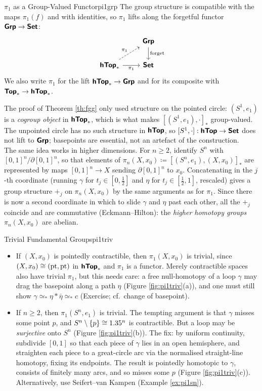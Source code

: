 \begin{remark}{$\pi_1$ as a Group-Valued Functor}{pi1grp}
  The group structure is compatible with the maps $\pi_1(f)$ and with identities, so $\pi_1$ lifts along the forgetful functor $\bm{\mathsf{Grp}}\to\bm{\mathsf{Set}}$: \[
  \begin{tikzcd}
    & \Grp \ar[d, "\text{forget}"] \\
    \hToppt \ar[ur, dashed, "\pi_1"] \ar[r, "\pi_1"'] & \Set
  \end{tikzcd}
  \]
  We also write $\pi_1$ for the lift $\bm{\mathsf{hTop}}_*\to\bm{\mathsf{Grp}}$ and for its composite with $\bm{\mathsf{Top}}_*\to\bm{\mathsf{hTop}}_*$.
\end{remark}

The proof of Theorem \ref{th:fgg} only used structure on the pointed circle: $(S^1,e_1)$ is a \emph{cogroup object} in $\bm{\mathsf{hTop}}_*$, which is what makes $[(S^1,e_1),\cdot]_*$ group-valued. The unpointed circle has no such structure in $\bm{\mathsf{hTop}}$, so $[S^1,\cdot]:\bm{\mathsf{hTop}}\to\bm{\mathsf{Set}}$ does not lift to $\bm{\mathsf{Grp}}$; basepoints are essential, not an artefact of the construction.\\

The same idea works in higher dimensions. For $n\geq 2$, identify $S^n$ with $[0,1]^n/\partial[0,1]^n$, so that elements of $\pi_n(X,x_0)\coloneq[(S^n,e_1),(X,x_0)]_*$ are represented by maps $[0,1]^n\to X$ sending $\partial[0,1]^n$ to $x_0$. Concatenating in the $j$-th coordinate (running $\gamma$ for $t_j\in[0,\tfrac12]$ and $\eta$ for $t_j\in[\tfrac12,1]$, rescaled) gives a group structure $+_j$ on $\pi_n(X,x_0)$ by the same arguments as for $\pi_1$. Since there is now a second coordinate in which to slide $\gamma$ and $\eta$ past each other, all the $+_j$ coincide and are commutative (Eckmann--Hilton): the \emph{higher homotopy groups} $\pi_n(X,x_0)$ are abelian.

\begin{example}{Trivial Fundamental Groups}{pi1triv}
  \begin{itemize}
    \item If $(X,x_0)$ is pointedly contractible, then $\pi_1(X,x_0)$ is trivial, since $(X,x_0)\cong(\mathrm{pt},\mathrm{pt})$ in $\bm{\mathsf{hTop}}_*$ and $\pi_1$ is a functor. Merely contractible spaces also have trivial $\pi_1$, but this needs care: a free null-homotopy of a loop $\gamma$ may drag the basepoint along a path $\eta$ (Figure \ref{fig:pi1triv}(a)), and one must still show $\gamma\simeq_*\eta\ast\bar\eta\simeq_* c$ (Exercise; cf.\ change of basepoint).
    \item If $n\geq 2$, then $\pi_1(S^n,e_1)$ is trivial. The tempting argument is that $\gamma$ misses some point $p$, and $S^n\setminus\{p\}\cong1.35^n$ is contractible. But a loop may be \emph{surjective} onto $S^n$ (Figure \ref{fig:pi1triv}(b)). The fix: by uniform continuity, subdivide $[0,1]$ so that each piece of $\gamma$ lies in an open hemisphere, and straighten each piece to a great-circle arc via the normalised straight-line homotopy, fixing its endpoints. The result is pointedly homotopic to $\gamma$, consists of finitely many arcs, and so misses some $p$ (Figure \ref{fig:pi1triv}(c)). Alternatively, use Seifert--van Kampen (Example \ref{ex:pi1sn}).
  \end{itemize}
\end{example}

